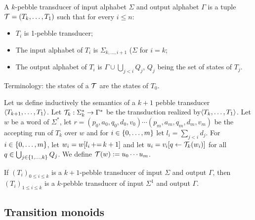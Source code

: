 \begin{definition}
A $k$-pebble transducer of input alphabet $\Sigma$ and output alphabet $\Gamma$ is a tuple ${\mathcal T}=(T_k,\dots,T_{1})$ such that for every $i\leq n$:
\begin{itemize}
\item  $T_i$ is 1-pebble transducer;
\item  The input alphabet of $T_i$ is $\Sigma_{k,\ldots,i+1}$ ($\Sigma$ for $i=k$;
\item  The output alphabet of $T_i$ is $\Gamma\cup\bigcup_{j<i} Q_j$, $Q_j$ being the set of states of $T_j$.
\end{itemize} 
Terminology: the states of a ${\mathcal T}$ are the states of $T_0$. 
\end{definition}

Let us define inductively the semantics of a $k+1$ pebble transducer $\langle T_{k+1},\ldots, T_1 \rangle$.
Let ${\mathcal T}_k:\Sigma_k^*\rightarrow \Gamma^*$ be the transduction realized by$\langle T_{k},\ldots, T_1 \rangle$.
Let $w$ be a word of $\Sigma^*$, let $r=(p_0,a_0,q_0,d_0,v_0)\cdots (p_m,a_m,q_m,d_m,v_m)$ be the accepting run of $T_k$ over $w$ and for  $i\in \{0,\ldots,m\}$ let  $l_i=\sum_{j< i }d_j$.
For  $i\in \{0,\ldots,m\}$, let $w_i=w[l_i\mathop{{+}{=}} k+1]$ and let $u_i=v_i[q\leftarrow {\mathcal T}_k(w_i)]$ for all $q\in \bigcup_{j\in \{1,\ldots,k\}}Q_j$.
We define ${\mathcal T}(w):=u_0\cdots u_m$.

\begin{remark}
If $(T_i)_{0 \leq i\leq k}$ is a $k+1$-pebble transducer of input $\Sigma$ and output $\Gamma$, then $(T_i)_{1\leq i\leq k}$ is a $k$-pebble transducer of input $\Sigma^1$ and output $\Gamma$.
\end{remark}

\subsection{Transition monoids}

